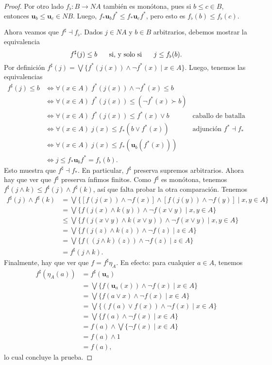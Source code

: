 \documentclass[12pt,letterpaper,titlepage]{article}
\theoremstyle{definition}
\renewcommand\sup{\vee}
\newcommand\Sup{\bigvee}
\renewcommand\inf{\wedge}
\newcommand\ssi{\hspace{5mm}\text{ si, y solo si }\hspace{5mm}}
\newcommand\unuc[1]{\mathbf u_{#1}}
\newcommand\<{\langle}
\renewcommand\>{\rangle}
\begin{document}
\begin{proof}
  Por otro lado $f_\flat:B\to NA$ también es monótona,
  pues si $b\leq c\in B$, entonces $\unuc b\leq\unuc c \in NB$.
  Luego, $f_*\unuc bf^*\leq f_*\unuc cf^*$, pero
  esto es $f_\flat(b)\leq f_\flat(c)$.

  Ahora veamos que $f^\sharp \dashv f_\flat$.
  Dados $j\in NA$ y $b\in B$ arbitrarios, debemos mostrar la
  equivalencia
  \[
    f^\sharp(j)\leq b \ssi j\leq f_\flat(b)
  .\]
  Por definición
  $f^\sharp(j)=\Sup\{f^*(j(x))\inf\neg f^*(x) \mid x\in A\}$.
  Luego, tenemos las equivalencias
  \begin{align*}
    f^\sharp(j) \leq b
    &\iff \forall(x\in A)\;f^*(j(x))\inf\neg f^*(x)\leq b \\
    &\iff \forall(x\in A)\;f^*(j(x))\leq (\neg f^*(x)\succ b) \\
    &\iff \forall(x\in A)\;f^*(j(x)) \leq f^*(x)\sup b
      & \text{caballo de batalla} \\
    &\iff \forall(x\in A)\;j(x) \leq f_*(b\sup f^*(x))
      & \text{adjunción } f^*\dashv f_* \\
    &\iff \forall(x\in A)\;j(x) \leq f_*(\unuc b(f^*(x))) \\
    &\iff j\leq f_*\unuc b f^* = f_\flat(b).
  \end{align*}
  Esto muestra que $f^\sharp\dashv f_*$.
  En particular, $f^\sharp$ preserva supremos arbitrarios.
  Ahora hay que ver que $f^\sharp$ preserva ínfimos finitos.
  Como $f^\sharp$ es monótona, tenemos
  $f^\sharp(j\inf k)\leq f^\sharp(j)\inf f^\sharp(k)$,
  así que falta probar la otra comparación.
  Tenemos
  \begin{align*}
    f^\sharp(j)\inf f^\sharp(k)
    &= \Sup\Big\{[f(j(x))\inf\neg f(x)]
        \inf[f(j(y))\inf\neg f(y)] \mid x,y\in A\Big\} \\
    &= \Sup\Big\{f(j(x)\inf k(y))\inf\neg f(x\sup y)
        \mid x,y\in A\Big\} \\
    &\leq \Sup\Big\{f(j(x\sup y)\inf k(x\sup y))
        \inf\neg f(x\sup y) \mid x,y\in A\Big\} \\
    &= \Sup\Big\{f(j(z)\inf k(z))
        \inf\neg f(z) \mid z\in A\Big\} \\
    &= \Sup\Big\{f((j\inf k)(z))
        \inf\neg f(z) \mid z\in A\Big\} \\
    &= f^\sharp(j\inf k).
  \end{align*}
  Finalmente, hay que ver que $f=f^\sharp \eta_A$.
  En efecto: para cualquier $a\in A$, tenemos
  \begin{align*}
    f^\sharp(\eta_A(a))
    &= f^\sharp(\unuc a) \\
    &= \Sup\{f(\unuc a(x))\inf\neg f(x)\mid x\in A\} \\
    &= \Sup\{f(a\sup x)\inf\neg f(x)\mid x\in A\} \\
    &= \Sup\{(f(a)\sup f(x))\inf\neg f(x)\mid x\in A\} \\
    &= \Sup\{f(a)\inf\neg f(x)\mid x\in A\} \\
    &= f(a)\inf\Sup\{\neg f(x)\mid x\in A\} \\
    &= f(a)\inf 1 \\
    &= f(a),
  \end{align*}
  lo cual concluye la prueba.
\end{proof}
\end{document}
